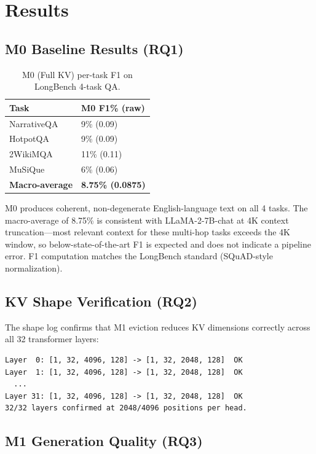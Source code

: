 \section{Results}
\label{sec:results}

\subsection{M0 Baseline Results (RQ1)}

\begin{table}[h]
\centering
\caption{M0 (Full KV) per-task F1 on LongBench 4-task QA.}
\label{tab:m0}
\begin{tabular}{ll}
\toprule
Task & M0 F1\% (raw) \\
\midrule
NarrativeQA & 9\% (0.09) \\
HotpotQA & 9\% (0.09) \\
2WikiMQA & 11\% (0.11) \\
MuSiQue & 6\% (0.06) \\
\midrule
\textbf{Macro-average} & \textbf{8.75\% (0.0875)} \\
\bottomrule
\end{tabular}
\end{table}

M0 produces coherent, non-degenerate English-language text on all 4 tasks. The macro-average of 8.75\% is consistent with LLaMA-2-7B-chat at 4K context truncation---most relevant context for these multi-hop tasks exceeds the 4K window, so below-state-of-the-art F1 is expected and does not indicate a pipeline error. F1 computation matches the LongBench standard (SQuAD-style normalization).

\subsection{KV Shape Verification (RQ2)}

The shape log confirms that M1 eviction reduces KV dimensions correctly across all 32 transformer layers:

\begin{verbatim}
Layer  0: [1, 32, 4096, 128] -> [1, 32, 2048, 128]  OK
Layer  1: [1, 32, 4096, 128] -> [1, 32, 2048, 128]  OK
  ...
Layer 31: [1, 32, 4096, 128] -> [1, 32, 2048, 128]  OK
32/32 layers confirmed at 2048/4096 positions per head.
\end{verbatim}

\subsection{M1 Generation Quality (RQ3)}

